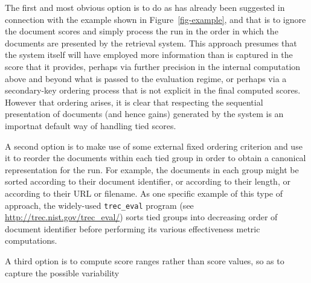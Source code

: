 
The first and most obvious option is to do as has already been
suggested in connection with the example shown in
Figure~\ref{fig-example}, and that is to ignore the document scores
and simply process the run in the order in which the documents are
presented by the retrieval system.
This approach presumes that the system itself will have employed more
information than is captured in the score that it provides, perhaps
via further precision in the internal computation above and beyond
what is passed to the evaluation regime, or perhaps via a
secondary-key ordering process that is not explicit in the final
computed scores.
However that ordering arises, it is clear that respecting the
sequential presentation of documents (and hence gains) generated by
the system is an importnat default way of handling tied scores.


A second option is to make use of some external fixed ordering
criterion and use it to reorder the documents within each tied group
in order to obtain a canonical representation for the run.
For example, the documents in each group might be sorted according to
their document identifier, or according to their length, or according
to their URL or filename.
As one specific example of this type of approach, the widely-used
{\tt{trec\_eval}} program (see
{\small\url{http://trec.nist.gov/trec_eval/}}) sorts tied groups into
decreasing order of document identifier before performing its various
effectiveness metric computations.


A third option is to compute score ranges rather than score values,
so as to capture the possible variability 


